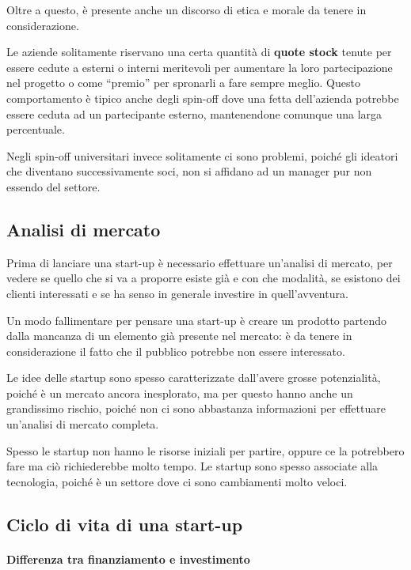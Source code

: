 

Oltre a questo, è presente anche un discorso di etica e morale da tenere in
considerazione.

Le aziende solitamente riservano una certa quantità di \textbf{quote stock}
tenute per essere cedute a esterni o interni meritevoli per aumentare la loro
partecipazione nel progetto o come ``premio'' per spronarli a fare sempre
meglio. Questo comportamento è tipico anche degli spin-off dove una fetta
dell'azienda potrebbe essere ceduta ad un partecipante esterno, mantenendone
comunque una larga percentuale.

Negli spin-off universitari invece solitamente ci sono problemi, poiché gli
ideatori che diventano successivamente soci, non si affidano ad un manager pur
non essendo del settore.

\subsection{Analisi di mercato}

Prima di lanciare una start-up è necessario effettuare un'analisi di mercato,
per vedere se quello che si va a proporre esiste già e con che modalità, se
esistono dei clienti interessati e se ha senso in generale investire in
quell'avventura.

Un modo fallimentare per pensare una start-up è creare un prodotto partendo
dalla mancanza di un elemento già presente nel mercato: è da tenere in
considerazione il fatto che il pubblico potrebbe non essere interessato.

Le idee delle startup sono spesso caratterizzate dall'avere grosse
potenzialità, poiché è un mercato ancora inesplorato, ma per questo hanno anche
un grandissimo rischio, poiché non ci sono abbastanza informazioni per
effettuare un'analisi di mercato completa.

Spesso le startup non hanno le risorse iniziali per
partire, oppure ce la potrebbero fare ma ciò richiederebbe molto tempo. Le
startup sono spesso associate alla tecnologia, poiché è un settore dove ci sono
cambiamenti molto veloci.

\subsection{Ciclo di vita di una start-up}

\paragraph*{Differenza tra finanziamento e investimento}

